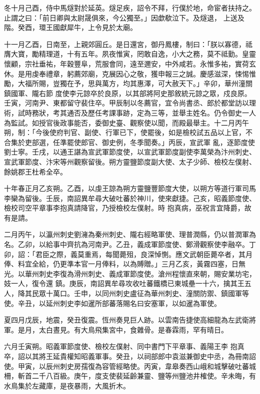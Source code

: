 \begin{pinyinscope}
 冬十月己酉，侍中馬燧對於延英。燧足疾，詔令不拜，行僕於地，命宦者扶持之。止謂之曰：「前日卿與太尉晟俱來，今公獨至。」因歔欷泣下。及燧退，
 上送及階。癸酉，環王國獻犀牛，上令見於太廟。



 十一月乙酉，日南至，上親郊圓丘。是日還宮，御丹鳳樓，制曰：「朕以寡德，祗膺大寶，勵精理道，十有五年。夙夜惟寅，罔敢自逸，小大之務，莫不祗勤。皇靈懷顧，宗社垂祐，年穀豐阜，荒服會同，遠至邇安，中外咸若。永惟多祐，實荷玄休。是用虔奉禮章，躬薦郊廟，克展因心之敬，獲申報三之誠。慶感滋深，悚惕惟勵，大福所賜，豈獨在予，思與萬方，均其惠澤，可大赦天下。」辛卯，華州潼關鎮國軍、隴右節
 度使李元諒卒於良原，以其部將阿史那敘統元諒之眾，戍良原。壬寅，河南尹、東都留守裴住卒。甲辰制以冬薦官，宜令尚書丞、郎於都堂訪以理術，試時務狀，考其通否及歷任考課事跡，定為三等，並舉主姓名。仍令御史一人為監試。如授官後政事能否，委御史臺、觀察使以聞，而殿最舉主。十二月丙午朔，制：「今後使府判官、副使、行軍已下，使罷後，如是檢校試五品以上官，不合集於吏部選，任準罷使郎官、御史例，冬季聞奏。」丙辰，宣武軍
 亂，逐節度使劉士寧。壬戌，以通王諶為宣武軍節度使，以宣武軍節度副使李萬榮為汴州刺史、宣武軍節度、汴宋等州觀察留後。朔方靈鹽節度副大使、太子少師、檢校左僕射、餘姚郡王杜希全卒。



 十年春正月乙亥朔。乙酉，以虔王諒為朔方靈鹽豐節度大使，以朔方等道行軍司馬李欒為留後。壬辰，南詔異牟尋大破吐蕃於神川，使來獻捷。己亥，昭義節度使、檢校司空平章事李抱真請降官，乃授檢校左僕射。時
 抱真病，巫祝言宜降爵，故有是請。



 二月丙午，以瀛州刺史劉澭為秦州刺史、隴右經略軍使、理普潤縣，仍以普潤軍為名。乙卯，以給事中齊抗為河南尹。乙丑，義成軍節度使、鄭滑觀察使李融卒。丁卯，詔：「君臣之際，義莫重焉，每聞薨殂，良深悼惻。應文武朝臣薨卒者，其月俸、料宜全給，仍更準本官一月俸料，以為賻贈。」三月乙亥，黃霧四塞，日無光。以華州刺史李復為滑州刺史、義成軍節度使。滄州程懷直來朝，賜安業坊宅，妓一人，復令還
 鎮。庚辰，南詔異牟尋攻收吐蕃鐵橋已東城壘一十六，擒其王五人，降其民眾十萬口。壬申，以同州刺史盧征為華州刺史、潼關防禦、鎮國軍等使。辛丑，以延州刺史李如暹所部蕃落賜名曰安塞軍，以如暹為軍使。



 夏四月戊辰，地震，癸丑復震。恆州奏見巨人跡。以雲南告捷使高細龍為左武衛將軍。是月，太白晝見。有大鳥飛集宮中，食雜骨。是春霖雨，罕有晴日。



 六月壬寅朔。昭義軍節度使、檢校左僕射、同中書門下平章事、義陽王李
 抱真卒，詔以其將王延貴權知昭義軍事。癸丑，以祠部郎中袁滋兼御史中丞，為冊南詔使。甲寅，以辰州刺史房孺復為容管經略使。丙寅，韋皋奏西山峨和城擊破吐蕃城柵，斬首二千八百級。庚午，度支使裴延齡兼靈、鹽等州鹽池井榷使。辛未晦，有水鳥集於左藏庫，是夜暴雨，大風折木。




\end{pinyinscope}
